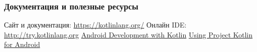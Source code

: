 \documentclass{beamer}
\begin{document}
\begin{frame}
    \frametitle{Документация и полезные ресурсы}
    Сайт и документация: \url{https://kotlinlang.org/}
    Онлайн IDE: \url{http://try.kotlinlang.org}
    \href{http://www.youtube.com/watch?v=A2LukgT2mKc}{Android Development with Kotlin}
    \href{https://docs.google.com/document/d/1ReS3ep-hjxWA8kZi0YqDbEhCqTt29hG8P44aA9W0DM8/edit?hl=en&forcehl=1}{Using Project Kotlin for Android}
\end{frame}
\end{document}
